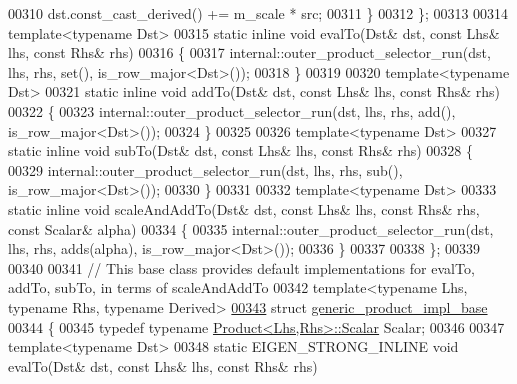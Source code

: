 \begin{DoxyCode}
00310       dst.const\_cast\_derived() += m\_scale * src;
00311     \}
00312   \};
00313   
00314   \textcolor{keyword}{template}<\textcolor{keyword}{typename} Dst>
00315   \textcolor{keyword}{static} \textcolor{keyword}{inline} \textcolor{keywordtype}{void} evalTo(Dst& dst, \textcolor{keyword}{const} Lhs& lhs, \textcolor{keyword}{const} Rhs& rhs)
00316   \{
00317     internal::outer\_product\_selector\_run(dst, lhs, rhs, \textcolor{keyword}{set}(), is\_row\_major<Dst>());
00318   \}
00319   
00320   \textcolor{keyword}{template}<\textcolor{keyword}{typename} Dst>
00321   \textcolor{keyword}{static} \textcolor{keyword}{inline} \textcolor{keywordtype}{void} addTo(Dst& dst, \textcolor{keyword}{const} Lhs& lhs, \textcolor{keyword}{const} Rhs& rhs)
00322   \{
00323     internal::outer\_product\_selector\_run(dst, lhs, rhs, add(), is\_row\_major<Dst>());
00324   \}
00325   
00326   \textcolor{keyword}{template}<\textcolor{keyword}{typename} Dst>
00327   \textcolor{keyword}{static} \textcolor{keyword}{inline} \textcolor{keywordtype}{void} subTo(Dst& dst, \textcolor{keyword}{const} Lhs& lhs, \textcolor{keyword}{const} Rhs& rhs)
00328   \{
00329     internal::outer\_product\_selector\_run(dst, lhs, rhs, sub(), is\_row\_major<Dst>());
00330   \}
00331   
00332   \textcolor{keyword}{template}<\textcolor{keyword}{typename} Dst>
00333   \textcolor{keyword}{static} \textcolor{keyword}{inline} \textcolor{keywordtype}{void} scaleAndAddTo(Dst& dst, \textcolor{keyword}{const} Lhs& lhs, \textcolor{keyword}{const} Rhs& rhs, \textcolor{keyword}{const} Scalar& alpha)
00334   \{
00335     internal::outer\_product\_selector\_run(dst, lhs, rhs, adds(alpha), is\_row\_major<Dst>());
00336   \}
00337   
00338 \};
00339 
00340 
00341 \textcolor{comment}{// This base class provides default implementations for evalTo, addTo, subTo, in terms of scaleAndAddTo}
00342 \textcolor{keyword}{template}<\textcolor{keyword}{typename} Lhs, \textcolor{keyword}{typename} Rhs, \textcolor{keyword}{typename} Derived>
\hyperlink{struct_eigen_1_1internal_1_1generic__product__impl__base}{00343} \textcolor{keyword}{struct }\hyperlink{struct_eigen_1_1internal_1_1generic__product__impl__base}{generic\_product\_impl\_base}
00344 \{
00345   \textcolor{keyword}{typedef} \textcolor{keyword}{typename} \hyperlink{group___core___module_class_eigen_1_1_product}{Product<Lhs,Rhs>::Scalar} Scalar;
00346   
00347   \textcolor{keyword}{template}<\textcolor{keyword}{typename} Dst>
00348   \textcolor{keyword}{static} EIGEN\_STRONG\_INLINE \textcolor{keywordtype}{void} evalTo(Dst& dst, \textcolor{keyword}{const} Lhs& lhs, \textcolor{keyword}{const} Rhs& rhs)

\end{DoxyCode}
